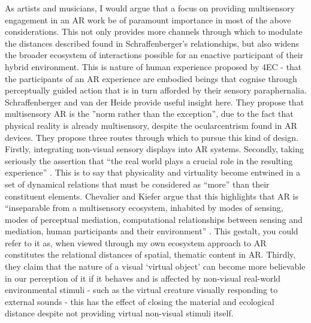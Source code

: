 As artists and musicians, I would argue that a focus on providing multisensory engagement in an AR work be of paramount importance in most of the above considerations. This not only provides more channels through which to modulate the distances described found in Schraffenberger's relationships, but also widens the broader ecosystem of interactions possible for an enactive participant of their hybrid environment. This is nature of human experience proposed by 4EC - that the participants of an AR experience are embodied beings that cognise through perceptually guided action that is in turn afforded by their sensory paraphernalia. Schraffenberger and van der Heide provide useful insight here. They propose that multisensory AR is the ”norm rather than the exception”, due to the fact that physical reality is already multisensory, despite the ocularcentrism found in AR devices. They propose three routes through which to pursue this kind of design. Firstly, integrating non-visual sensory displays into  AR systems. Secondly, taking seriously the assertion that “the real world plays a crucial role in the resulting experience” \citep[p. 5]{schraffenberger2016}. This is to say that physicality and virtuality become entwined in a set of dynamical relations that must be considered as “more” than their constituent elements. Chevalier and Kiefer argue that this highlights that AR is “inseparable from a multisensory ecosystem, inhabited by modes of sensing, modes of perceptual mediation, computational relationships between sensing and mediation, human participants and their environment” \citeyearpar[p. 4]{chevalier2020}. This gestalt, you could refer to it as, when viewed through my own ecosystem approach to AR constitutes the relational distances of spatial, thematic content in AR. Thirdly, they claim that the nature of a visual ‘virtual object’ can become more believable in our perception of it if it behaves and is affected by non-visual real-world environmental stimuli - such as the virtual creature visually responding to external sounds - this has the effect of closing the material and ecological distance despite not providing virtual non-visual stimuli itself. 


